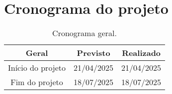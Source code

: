 \chapter{Cronograma do projeto}

\begin{table}[htpb]
\begin{center}
\caption{Cronograma geral.}
\begin{tabular}{|c|c|c|}
\hline
\textbf{Geral}          & \textbf{Previsto} & \textbf{Realizado} \\ \hline
Início do projeto       & 21/04/2025        & 21/04/2025         \\ \hline
Fim do projeto          & 18/07/2025        & 18/07/2025         \\ \hline
\end{tabular}
\end{center}
\end{table}

